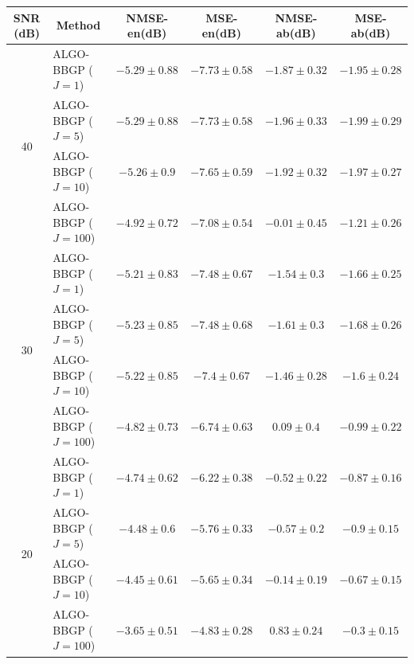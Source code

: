 \begin{table}[h]
\centering
\begin{adjustbox}{max width=\textwidth}
\begin{tabular}{|c|l|c|c|c|c|}
\hline
SNR (dB)            & \multicolumn{1}{c|}{Method}  & NMSE-en(dB)         & MSE-en(dB)          & NMSE-ab(dB)         & MSE-ab(dB)          \tabularnewline \hline
\multirow{4}{*}{40} & ALGO-BBGP ($J=1$)            & $-5.29    \pm 0.88$ & $-7.73    \pm 0.58$ & $-1.87    \pm 0.32$ & $-1.95    \pm 0.28$ \tabularnewline
                    & ALGO-BBGP ($J=5$)            & $-5.29    \pm 0.88$ & $-7.73    \pm 0.58$ & $-1.96    \pm 0.33$ & $-1.99    \pm 0.29$ \tabularnewline
                    & ALGO-BBGP ($J=10$)           & $-5.26    \pm 0.9$  & $-7.65    \pm 0.59$ & $-1.92    \pm 0.32$ & $-1.97    \pm 0.27$ \tabularnewline
                    & ALGO-BBGP ($J=100$)          & $-4.92    \pm 0.72$ & $-7.08    \pm 0.54$ & $-0.01    \pm 0.45$ & $-1.21    \pm 0.26$ \tabularnewline \hline
\multirow{4}{*}{30} & ALGO-BBGP ($J=1$)            & $-5.21    \pm 0.83$ & $-7.48    \pm 0.67$ & $-1.54    \pm 0.3$  & $-1.66    \pm 0.25$ \tabularnewline
                    & ALGO-BBGP ($J=5$)            & $-5.23    \pm 0.85$ & $-7.48    \pm 0.68$ & $-1.61    \pm 0.3$  & $-1.68    \pm 0.26$ \tabularnewline
                    & ALGO-BBGP ($J=10$)           & $-5.22    \pm 0.85$ & $-7.4     \pm 0.67$ & $-1.46    \pm 0.28$ & $-1.6     \pm 0.24$ \tabularnewline
                    & ALGO-BBGP ($J=100$)          & $-4.82    \pm 0.73$ & $-6.74    \pm 0.63$ & $0.09     \pm 0.4$  & $-0.99    \pm 0.22$ \tabularnewline \hline
\multirow{4}{*}{20} & ALGO-BBGP ($J=1$)            & $-4.74    \pm 0.62$ & $-6.22    \pm 0.38$ & $-0.52    \pm 0.22$ & $-0.87    \pm 0.16$ \tabularnewline
                    & ALGO-BBGP ($J=5$)            & $-4.48    \pm 0.6$  & $-5.76    \pm 0.33$ & $-0.57    \pm 0.2$  & $-0.9     \pm 0.15$ \tabularnewline
                    & ALGO-BBGP ($J=10$)           & $-4.45    \pm 0.61$ & $-5.65    \pm 0.34$ & $-0.14    \pm 0.19$ & $-0.67    \pm 0.15$ \tabularnewline
                    & ALGO-BBGP ($J=100$)          & $-3.65    \pm 0.51$ & $-4.83    \pm 0.28$ & $0.83     \pm 0.24$ & $-0.3     \pm 0.15$ \tabularnewline \hline

\end{tabular}
\end{adjustbox}
\end{table}
